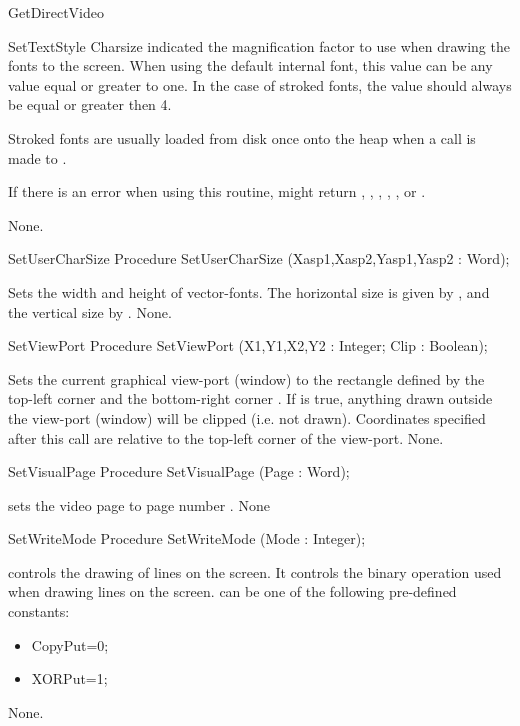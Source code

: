 \begin{function}{GetDirectVideo}
\begin{procedure}{SetTextStyle}
Charsize indicated the magnification factor to use when drawing the fonts
to the screen. When using the default internal font, this value can be
any value equal or greater to one. In the case of stroked fonts, the
value should always be equal or greater then 4.

Stroked fonts are usually loaded from disk once onto the heap when a call
is made to .

If there is an error when using this routine,  might return
, , , ,
, or .

\Errors
None.
\SeeAlso
{} 
\end{procedure}
\begin{procedure}{SetUserCharSize}
\Declaration
Procedure SetUserCharSize (Xasp1,Xasp2,Yasp1,Yasp2 : Word);

\Description
Sets the width and height of vector-fonts. The horizontal size is given
by , and the vertical size by .
\Errors
None.
\SeeAlso
{}
\end{procedure}
\begin{procedure}{SetViewPort}
\Declaration
Procedure SetViewPort (X1,Y1,X2,Y2 : Integer; Clip : Boolean);

\Description
Sets the current graphical view-port (window) to the rectangle defined by
the top-left corner  and the bottom-right corner .
If  is true, anything drawn outside the view-port (window) will be
clipped (i.e. not drawn). Coordinates specified after this call are relative
to the top-left corner of the view-port.
\Errors
None.
\SeeAlso
{}
\end{procedure}
\begin{procedure}{SetVisualPage}
\Declaration
Procedure SetVisualPage (Page : Word);

\Description
{} sets the video page to page number . 
\Errors
None
\SeeAlso
{}
\end{procedure}
\begin{procedure}{SetWriteMode}
\Declaration
Procedure SetWriteMode (Mode : Integer);

\Description
{} controls the drawing of lines on the screen. It controls
the binary operation used when drawing lines on the screen.  can
be one of the following pre-defined constants:
\begin{itemize}
\item CopyPut=0;
\item XORPut=1;
\end{itemize}
\Errors
None.
\SeeAlso


\end{procedure}
\end{function}
